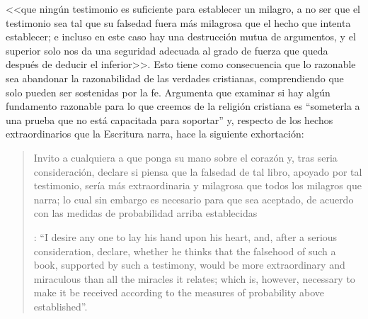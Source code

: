 {<<que ningún testimonio es suficiente para establecer un milagro, a no ser que el testimonio sea tal que su falsedad fuera más milagrosa que el hecho que intenta establecer; e incluso en este caso hay una destrucción mutua de argumentos, y el superior solo nos da una seguridad adecuada al grado de fuerza que queda después de deducir el inferior>>}.
\label{subsec:humarg}
Esto tiene como consecuencia que lo razonable sea abandonar la razonabilidad de las verdades cristianas, comprendiendo que solo pueden ser sostenidas por la fe. Argumenta que examinar si hay algún fundamento razonable para lo que creemos de la religión cristiana es \enquote{someterla a una prueba que no está capacitada para soportar} y, respecto de los hechos extraordinarios que la Escritura narra, hace la siguiente exhortación: \blockquote[{\Cite[X,2. 90]{hume1777enquiry}: \enquote{I desire any one to lay his hand upon his heart, and, after a serious consideration, declare, whether he thinks that the falsehood of such a book, supported by such a testimony, would be more extraordinary and miraculous than all the miracles it relates; which is, however, necessary to make it be received according to the measures of probability above established}}.]{Invito a cualquiera a que ponga su mano sobre el corazón y, tras seria consideración, declare si piensa que la falsedad de tal libro, apoyado por tal testimonio, sería más extraordinaria y milagrosa que todos los milagros que narra; lo cual sin embargo es necesario para que sea aceptado, de acuerdo con las medidas de probabilidad arriba establecidas}.

